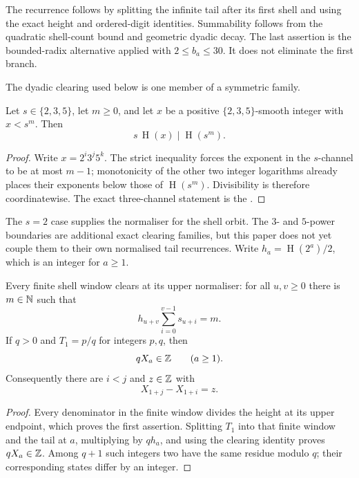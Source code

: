 \documentclass[11pt]{article}
\newcommand{\hgt}{\operatorname{H}}
\begin{document}
The recurrence follows by splitting the infinite tail after its first shell
and using the exact height and ordered-digit identities.  Summability follows
from the quadratic shell-count bound and geometric dyadic decay.  The last
assertion is the bounded-radix alternative applied with $2\le b_a\le30$.
It does not eliminate the first branch.

The dyadic clearing used below is one member of a symmetric family.

\begin{theorem}\label{res:prime-power-boundary-clearing}
Let $s\in\{2,3,5\}$, let $m\ge0$, and let $x$ be a positive
$\{2,3,5\}$-smooth integer with $x<s^m$.  Then
\[
 s\,\hgt(x)\mid\hgt(s^m).
\]
\end{theorem}

\begin{proof}
Write $x=2^i3^j5^k$.  The strict inequality forces the exponent in the
$s$-channel to be at most $m-1$; monotonicity of the other two integer
logarithms already places their exponents below those of $\hgt(s^m)$.
Divisibility is therefore coordinatewise.  The exact three-channel statement
is the
.
\end{proof}

The $s=2$ case supplies the normaliser for the shell orbit.  The $3$- and
$5$-power boundaries are additional exact clearing families, but this paper
does not yet couple them to their own normalised tail recurrences.  Write
$h_a=\hgt(2^a)/2$, which is an integer for $a\ge1$.

\begin{theorem}\label{res:all-scale-lattice}
Every finite shell window clears at its upper normaliser: for all
$u,v\ge0$ there is $m\in\mathbb{N}$ such that
\[
 h_{u+v}\sum_{i=0}^{v-1}s_{u+i}=m.
\]
If $q>0$ and $T_1=p/q$ for integers $p,q$, then
\[
 qX_a\in\mathbb{Z}\qquad(a\ge1).
\]
Consequently there are $i<j$ and $z\in\mathbb{Z}$ with
\[
 X_{1+j}-X_{1+i}=z.
\]
\end{theorem}

\begin{proof}
Every denominator in the finite window divides the height at its upper
endpoint, which proves the first assertion.  Splitting $T_1$ into that finite
window and the tail at $a$, multiplying by $q h_a$, and using the clearing
identity proves $qX_a\in\mathbb{Z}$.  Among $q+1$ such integers two have the same
residue modulo $q$; their corresponding states differ by an integer.
\end{proof}
\end{document}
